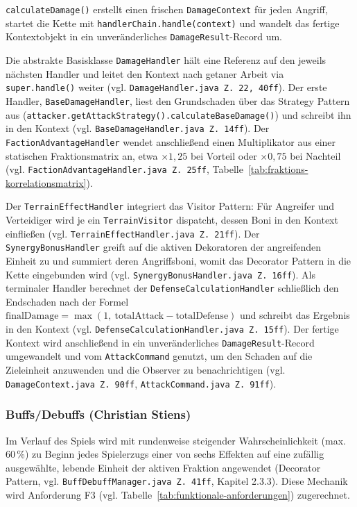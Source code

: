\texttt{calculateDamage()} erstellt einen frischen \texttt{DamageContext} für jeden Angriff, startet die Kette mit \texttt{handlerChain.handle(context)} und wandelt das fertige Kontextobjekt in ein unveränderliches \texttt{DamageResult}-Record um.

Die abstrakte Basisklasse \texttt{DamageHandler} hält eine Referenz auf den jeweils nächsten Handler und leitet den Kontext nach getaner Arbeit via \texttt{super.handle()} weiter (vgl. \texttt{DamageHandler.java Z.\,22, 40ff}).
Der erste Handler, \texttt{BaseDamageHandler}, liest den Grundschaden über das Strategy Pattern aus
(\texttt{attacker.getAttackStrategy()}\newline\texttt{.calculateBaseDamage()}) und schreibt ihn in den Kontext (vgl. \texttt{BaseDamageHandler.java Z.\,14ff}).
Der \texttt{FactionAdvantageHandler} wendet anschließend einen Multiplikator aus einer statischen Fraktionsmatrix an, etwa $\times 1{,}25$ bei Vorteil oder $\times 0{,}75$ bei Nachteil (vgl. \texttt{FactionAdvantageHandler.java Z.\,25ff}, Tabelle~\ref{tab:fraktions-korrelationsmatrix}).

Der \texttt{TerrainEffectHandler} integriert das Visitor Pattern: Für Angreifer und Verteidiger wird je ein \texttt{TerrainVisitor} dispatcht, dessen Boni in den Kontext einfließen (vgl. \texttt{TerrainEffectHandler.java Z. 21ff}).
Der \texttt{SynergyBonusHandler} greift auf die aktiven Dekoratoren der angreifenden Einheit zu und summiert deren Angriffsboni, womit das Decorator Pattern in die Kette eingebunden wird (vgl. \texttt{SynergyBonusHandler.java Z. 16ff}).
Als terminaler Handler berechnet der \texttt{DefenseCalculationHandler} schließlich den Endschaden nach der Formel $\text{finalDamage} = \max(1,\ \text{totalAttack} - \text{totalDefense})$ und schreibt das Ergebnis in den Kontext (vgl. \texttt{DefenseCalculationHandler.java Z. 15ff}).
Der fertige Kontext wird anschließend in ein unveränderliches \texttt{DamageResult}-Record umgewandelt und vom \texttt{AttackCommand} genutzt, um den Schaden auf die Zieleinheit anzuwenden und die Observer zu benachrichtigen (vgl. \texttt{DamageContext.java Z. 90ff}, \texttt{AttackCommand.java Z. 91ff}).

\subsubsection{Buffs/Debuffs (Christian Stiens)}
\label{subsec:buffs-debuffs}

Im Verlauf des Spiels wird mit rundenweise steigender Wahrscheinlichkeit (max. 60\,\%) zu Beginn jedes Spielerzugs einer von sechs Effekten auf eine zufällig ausgewählte, lebende Einheit der aktiven Fraktion angewendet (Decorator Pattern, vgl. \texttt{BuffDebuffManager.java Z.\,41ff}, Kapitel 2.3.3).
Diese Mechanik wird Anforderung F3 (vgl. Tabelle~\ref{tab:funktionale-anforderungen}) zugerechnet.

